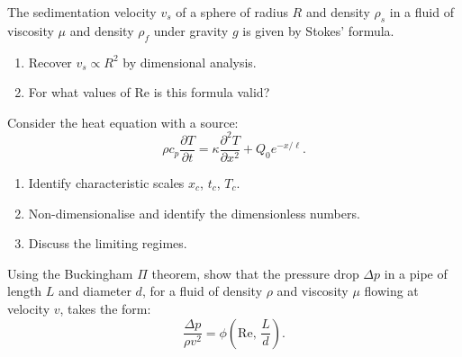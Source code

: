 \begin{exercise}
The sedimentation velocity $v_s$ of a sphere of radius $R$ and
density $\rho_s$ in a fluid of viscosity $\mu$ and density $\rho_f$
under gravity $g$ is given by Stokes' formula.
\begin{enumerate}
  \item Recover $v_s\propto R^2$ by dimensional analysis.
  \item For what values of Re is this formula valid?
\end{enumerate}
\end{exercise}

\begin{exercise}
Consider the heat equation with a source:
\[
  \rho c_p \frac{\partial T}{\partial t}
  = \kappa\frac{\partial^2 T}{\partial x^2} + Q_0 e^{-x/\ell}.
\]
\begin{enumerate}
  \item Identify characteristic scales $x_c$, $t_c$, $T_c$.
  \item Non-dimensionalise and identify the dimensionless numbers.
  \item Discuss the limiting regimes.
\end{enumerate}
\end{exercise}

\begin{exercise}
Using the Buckingham $\Pi$ theorem, show that the pressure drop
$\Delta p$ in a pipe of length $L$ and diameter $d$, for a fluid of
density $\rho$ and viscosity $\mu$ flowing at velocity $v$, takes
the form:
\[
  \frac{\Delta p}{\rho v^2} = \phi\!\left(\mathrm{Re},\,\frac{L}{d}\right).
\]
\end{exercise}
